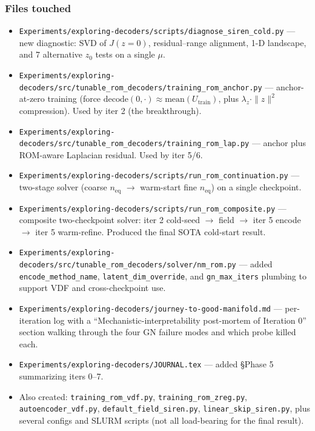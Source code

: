 \subsubsection*{Files touched}
\begin{itemize}
  \item \texttt{Experiments/exploring-decoders/scripts/diagnose\_siren\_cold.py}
        --- new diagnostic: SVD of $J(z{=}0)$, residual--range alignment,
        1-D landscape, and 7 alternative $z_0$ tests on a single $\mu$.
  \item \texttt{Experiments/exploring-decoders/src/tunable\_rom\_decoders/training\_rom\_anchor.py}
        --- anchor-at-zero training (force $\text{decode}(0,\cdot) \approx
        \text{mean}(U_{\text{train}})$, plus $\lambda_z \cdot \|z\|^2$
        compression). Used by iter 2 (the breakthrough).
  \item \texttt{Experiments/exploring-decoders/src/tunable\_rom\_decoders/training\_rom\_lap.py}
        --- anchor plus ROM-aware Laplacian residual. Used by iter 5/6.
  \item \texttt{Experiments/exploring-decoders/scripts/run\_rom\_continuation.py}
        --- two-stage solver (coarse $n_{\text{eq}}$ $\rightarrow$
        warm-start fine $n_{\text{eq}}$) on a single checkpoint.
  \item \texttt{Experiments/exploring-decoders/scripts/run\_rom\_composite.py}
        --- composite two-checkpoint solver: iter 2 cold-seed $\rightarrow$
        field $\rightarrow$ iter 5 encode $\rightarrow$ iter 5 warm-refine.
        Produced the final SOTA cold-start result.
  \item \texttt{Experiments/exploring-decoders/src/tunable\_rom\_decoders/solver/nm\_rom.py}
        --- added \texttt{encode\_method\_name},
        \texttt{latent\_dim\_override}, and \texttt{gn\_max\_iters} plumbing
        to support VDF and cross-checkpoint use.
  \item \texttt{Experiments/exploring-decoders/journey-to-good-manifold.md}
        --- per-iteration log with a ``Mechanistic-interpretability
        post-mortem of Iteration 0'' section walking through the four GN
        failure modes and which probe killed each.
  \item \texttt{Experiments/exploring-decoders/JOURNAL.tex} --- added
        \S Phase 5 summarizing iters 0--7.
  \item Also created: \texttt{training\_rom\_vdf.py},
        \texttt{training\_rom\_zreg.py}, \texttt{autoencoder\_vdf.py},
        \texttt{default\_field\_siren.py}, \texttt{linear\_skip\_siren.py},
        plus several configs and SLURM scripts (not all load-bearing for
        the final result).
\end{itemize}

